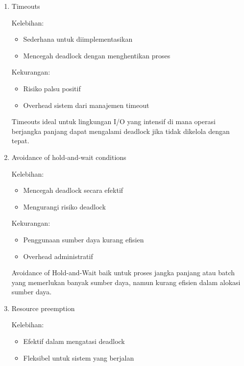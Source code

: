 \documentclass[12pt]{article}
\begin{document}
\begin{enumerate}
    \item Timeouts

          \hspace{0cm} Kelebihan:
            \begin{itemize}
              \item Sederhana untuk diimplementasikan
              \item Mencegah deadlock dengan menghentikan proses
            \end{itemize}


            \hspace{0cm} Kekurangan:
            \begin{itemize}
              \item Risiko palsu positif
              \item Overhead sistem dari manajemen timeout
            \end{itemize}

          \hspace{1cm}Timeouts ideal untuk lingkungan I/O yang intensif di mana operasi berjangka panjang dapat mengalami deadlock jika tidak dikelola dengan tepat.

    \item Avoidance of hold-and-wait conditions

          \hspace{0cm} Kelebihan:
            \begin{itemize}
              \item Mencegah deadlock secara efektif
              \item Mengurangi risiko deadlock
            \end{itemize}


            \hspace{0cm} Kekurangan:
            \begin{itemize}
              \item Penggunaan sumber daya kurang efisien
              \item Overhead administratif
            \end{itemize}

          \hspace{1cm}Avoidance of Hold-and-Wait baik untuk proses jangka panjang atau batch yang memerlukan banyak sumber daya, namun kurang efisien dalam alokasi sumber daya.
    \item Resource preemption

          \hspace{0cm} Kelebihan:
            \begin{itemize}
              \item Efektif dalam mengatasi deadlock
              \item Fleksibel untuk sistem yang berjalan
            \end{itemize}



\end{enumerate}
\end{document}
